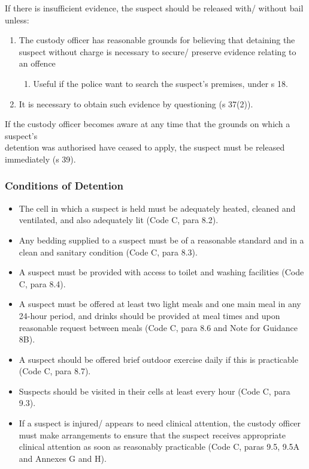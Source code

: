 \documentclass[
]{article}
\providecommand{\tightlist}{%
  \setlength{\itemsep}{0pt}\setlength{\parskip}{0pt}}
\begin{document}
If there is insufficient evidence, the suspect should be released with/
without bail unless:

\begin{enumerate}
\def\labelenumi{\arabic{enumi}.}
\tightlist
\item
  The custody officer has reasonable grounds for believing that
  detaining the suspect without charge is necessary to secure/ preserve
  evidence relating to an offence

  \begin{enumerate}
  \def\labelenumii{\arabic{enumii}.}
  \tightlist
  \item
    Useful if the police want to search the suspect's premises, under s
    18.
  \end{enumerate}
\item
  It is necessary to obtain such evidence by questioning (s 37(2)).
\end{enumerate}

If the custody officer becomes aware at any time that the grounds on
which a suspect's\\
detention was authorised have ceased to apply, the suspect must be
released immediately (s 39).

\hypertarget{conditions-of-detention}{%
\subsubsection{Conditions of Detention}\label{conditions-of-detention}}

\begin{itemize}
\tightlist
\item
  The cell in which a suspect is held must be adequately heated, cleaned
  and ventilated, and also adequately lit (Code C, para 8.2).
\item
  Any bedding supplied to a suspect must be of a reasonable standard and
  in a clean and sanitary condition (Code C, para 8.3).
\item
  A suspect must be provided with access to toilet and washing
  facilities (Code C, para 8.4).
\item
  A suspect must be offered at least two light meals and one main meal
  in any 24-hour period, and drinks should be provided at meal times and
  upon reasonable request between meals (Code C, para 8.6 and Note for
  Guidance 8B).
\item
  A suspect should be offered brief outdoor exercise daily if this is
  practicable (Code C, para 8.7).
\item
  Suspects should be visited in their cells at least every hour (Code C,
  para 9.3).
\item
  If a suspect is injured/ appears to need clinical attention, the
  custody officer must make arrangements to ensure that the suspect
  receives appropriate clinical attention as soon as reasonably
  practicable (Code C, paras 9.5, 9.5A and Annexes G and H).
\end{itemize}
\end{document}
